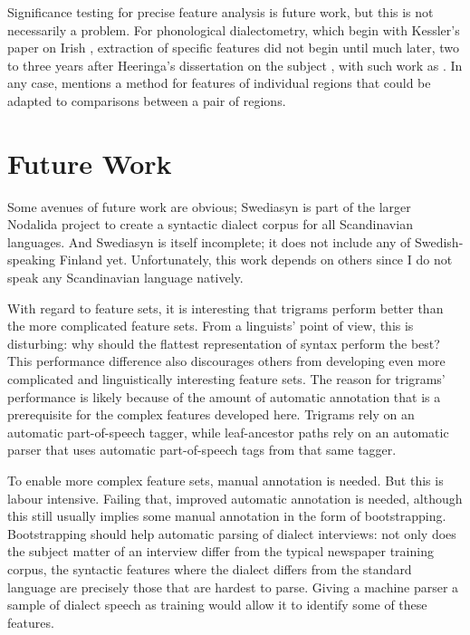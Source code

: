 Significance testing for precise feature analysis is future work, but
this is not necessarily a problem. For phonological dialectometry,
which begin with Kessler's paper on Irish \cite{kessler95}, extraction
of specific features did not begin until much later, two to three
years after Heeringa's dissertation on the subject \cite{heeringa04},
with such work as .
In any case,  mentions a method for features of
individual regions that could be adapted to comparisons between a pair
of regions.

\section{Future Work}

Some avenues of future work are obvious; Swediasyn is part of the
larger Nodalida project to create a syntactic dialect corpus for all
Scandinavian languages. And Swediasyn is itself incomplete; it does
not include any of Swedish-speaking Finland yet. Unfortunately, this
work depends on others since I do not speak any
Scandinavian language natively.

With regard to feature sets, it is interesting that trigrams perform better
than the more complicated feature sets. From a linguists' point of
view, this is disturbing: why should the flattest representation of
syntax perform the best? This performance difference also
discourages others from developing even more complicated and
linguistically interesting feature sets. The reason for trigrams'
performance is likely because of the amount of automatic annotation
that is a prerequisite for the complex features developed
here. Trigrams rely on an automatic part-of-speech tagger, while
leaf-ancestor paths rely on an automatic parser that uses automatic
part-of-speech tags from that same tagger.

To enable more complex feature sets, manual annotation is needed. But
this is labour intensive. Failing that, improved automatic annotation
is needed, although this still usually implies some manual
annotation in the form of bootstrapping. Bootstrapping should help
automatic parsing of dialect interviews: not only does the subject
matter of an interview differ from the typical newspaper training
corpus, the syntactic features where the dialect differs from the
standard language are precisely those that are hardest to
parse. Giving a machine parser a sample of dialect speech as training
would allow it to identify some of these features.

